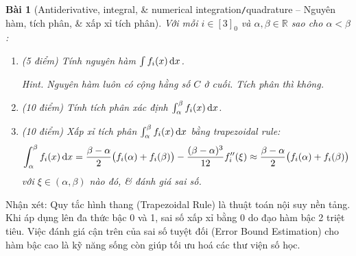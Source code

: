 \documentclass{article}
\newtheorem{baitoan}{Bài}
\begin{document}
\begin{baitoan}[Antiderivative, integral, \& numerical integration{\tt/}quadrature -- Nguyên hàm, tích phân, \& xấp xỉ tích phân]
	Với mỗi $i\in[3]_0$ và $\alpha, \beta \in \mathbb{R}$ sao cho $\alpha < \beta$:
	\begin{enumerate}[label=(\alph*)]
		\item {\rm(5 điểm)} Tính nguyên hàm $\int f_i(x)\,{\rm d}x$.
		
		{\sf Hint.} Nguyên hàm luôn có cộng hằng số $C$ ở cuối. Tích phân thì không.
		\item {\rm(10 điểm)} Tính tích phân xác định $\int_\alpha^\beta f_i(x)\,{\rm d}x$. 
		\item {\rm(10 điểm)} Xấp xỉ tích phân $\int_\alpha^\beta f_i(x)\,{\rm d}x$ bằng trapezoidal rule:
		\begin{equation*}
			\int_\alpha^\beta f_i(x)\,{\rm d}x = \frac{\beta - \alpha}{2}\big(f_i(\alpha) + f_i(\beta)\big) - \frac{(\beta - \alpha)^3}{12}f_i''(\xi) \approx \frac{\beta - \alpha}{2}\big(f_i(\alpha) + f_i(\beta)\big)
		\end{equation*}
		với $\xi\in(\alpha,\beta)$ nào đó, \& đánh giá sai số.
	\end{enumerate}
\end{baitoan}

\textsf{Nhận xét}: Quy tắc hình thang (Trapezoidal Rule) là thuật toán nội suy nền tảng. Khi áp dụng lên đa thức bậc 0 và 1, sai số xấp xỉ bằng $0$ do đạo hàm bậc 2 triệt tiêu. Việc đánh giá cận trên của sai số tuyệt đối (Error Bound Estimation) cho hàm bậc cao là kỹ năng sống còn giúp tối ưu hoá các thư viện số học.
\end{document}
